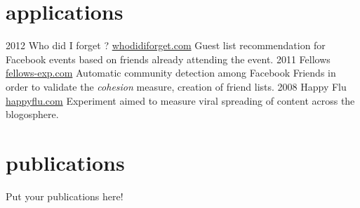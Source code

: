 \documentclass[]{friggeri-cv}
\begin{document}
\section{applications}

\begin{entrylist}
  \entry
    {2012}
    {Who did I forget ?}
    {\href{http://whodidiforget.com}{whodidiforget.com}}
    {Guest list recommendation for Facebook events based on friends already attending the event.}
  \entry
    {2011}
    {Fellows}
    {\href{http://fellows-exp.com}{fellows-exp.com}}
    {Automatic community detection among Facebook Friends in order to validate the \emph{cohesion} measure, creation of friend lists.}
  \entry
    {2008}
    {Happy Flu}
    {\href{http://happyflu.com}{happyflu.com}}
    {Experiment aimed to measure viral spreading of content across the blogosphere.}
\end{entrylist}

\section{publications}

Put your publications here!
\end{document}
